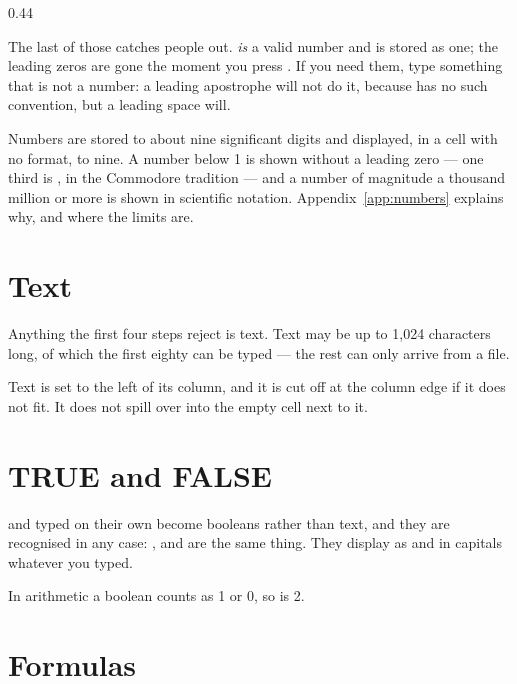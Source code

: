 \begin{ccexamples}{0.44\linewidth}
\end{ccexamples}

\begin{ccnote}
The last of those catches people out.  \emph{is} a valid number and is
stored as one; the leading zeros are gone the moment you press . If
you need them, type something that is not a number: a leading apostrophe will
not do it, because \ccprod{} has no such convention, but a leading space will.
\end{ccnote}

Numbers are stored to about nine significant digits and displayed, in a cell
with no format, to nine. A number below 1 is shown without a leading zero ---
one third is , in the Commodore tradition --- and a number of
magnitude a thousand million or more is shown in scientific notation.
Appendix~\ref{app:numbers} explains why, and where the limits are.

\section{Text}

Anything the first four steps reject is text. Text may be up to 1,024
characters long, of which the first eighty can be typed --- the rest can only
arrive from a file.

Text is set to the left of its column, and it is cut off at the column edge if
it does not fit. It does not spill over into the empty cell next to it.

\section{TRUE and FALSE}

 and  typed on their own become booleans rather than text,
and they are recognised in any case: ,  and  are
the same thing. They display as  and  in capitals whatever
you typed.

In arithmetic a boolean counts as 1 or 0, so  is 2.

\section{Formulas}

